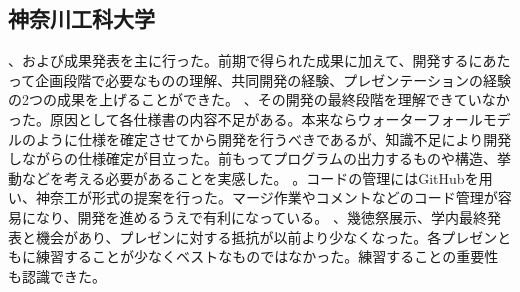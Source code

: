 \subsection{神奈川工科大学}
、および成果発表を主に行った。前期で得られた成果に加えて、開発するにあたって企画段階で必要なものの理解、共同開発の経験、プレゼンテーションの経験の2つの成果を上げることができた。
、その開発の最終段階を理解できていなかった。原因として各仕様書の内容不足がある。本来ならウォーターフォールモデルのように仕様を確定させてから開発を行うべきであるが、知識不足により開発しながらの仕様確定が目立った。前もってプログラムの出力するものや構造、挙動などを考える必要があることを実感した。
。コードの管理にはGitHubを用い、神奈工が形式の提案を行った。マージ作業やコメントなどのコード管理が容易になり、開発を進めるうえで有利になっている。
、幾徳祭展示、学内最終発表と機会があり、プレゼンに対する抵抗が以前より少なくなった。各プレゼンともに練習することが少なくベストなものではなかった。練習することの重要性も認識できた。
